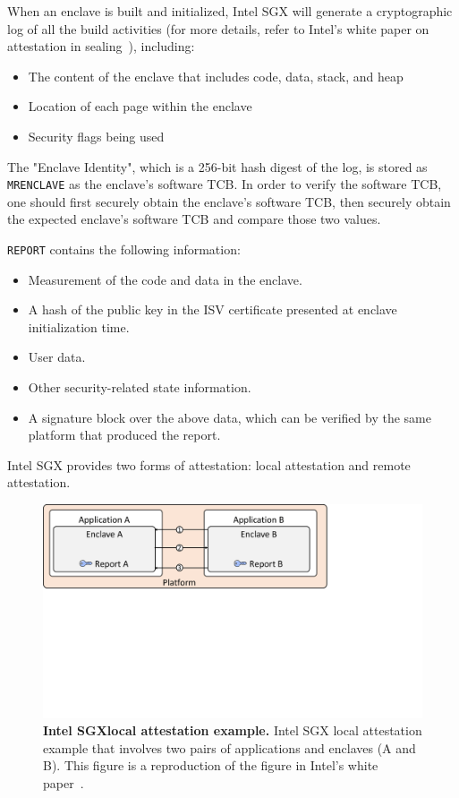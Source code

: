  When an enclave is built and initialized, Intel SGX will generate a cryptographic log of all the build activities (for more details, refer to Intel's white paper on attestation in sealing~\cite{attestation_primitive_all}), including:

\begin{itemize}
  \item The content of the enclave that includes code, data, stack, and heap
  \item Location of each page within the enclave
  \item Security flags being used
\end{itemize}
    
The "Enclave Identity", which is a 256-bit hash digest of the log, is stored as \texttt{MRENCLAVE} as the enclave's software TCB. In order to verify the software TCB, one should first securely obtain the enclave's software TCB, then securely obtain the expected enclave's software TCB and compare those two values.

 \texttt{REPORT} contains the following information:

\begin{itemize}
  \item Measurement of the code and data in the enclave.
  \item A hash of the public key in the ISV certificate presented at enclave initialization time.
  \item User data.
  \item Other security-related state information.
  \item A signature block over the above data, which can be verified by the same platform that produced the report.
\end{itemize}

Intel SGX provides two forms of attestation: local attestation and remote attestation.


\begin{figure}[t]
  \centering
    \includegraphics[trim={0 11cm 8cm 0},clip,width=0.9\linewidth]{chapters/background/figures/local_attestation.pdf}
    \caption[Intel SGX local attestation example]{\textbf{Intel SGXlocal attestation example.} Intel SGX local attestation example that involves two pairs of applications and enclaves (A and B). This figure is a reproduction of the figure in Intel's white paper~\cite{attestation_primitive_all}.}
    \label{fig:la_bg}
\end{figure}


